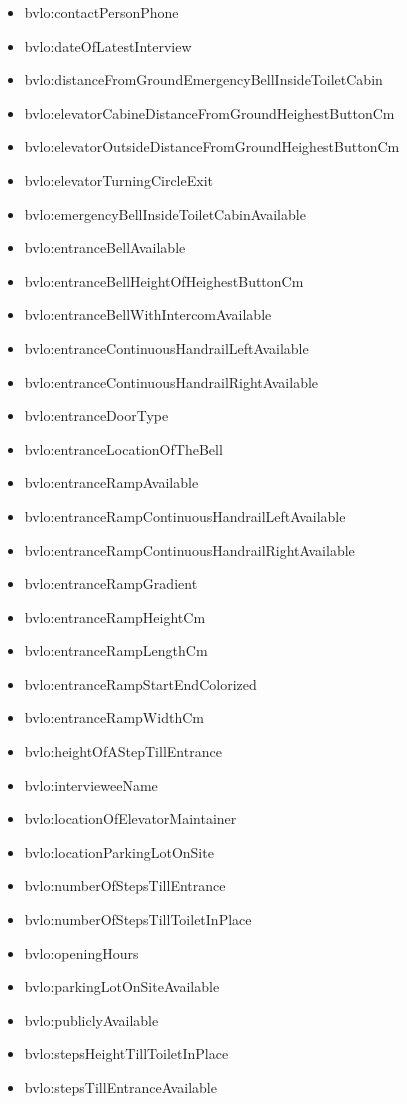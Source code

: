 \documentclass[a4paper,11pt]{article}
\begin{document}
\begin{itemize}
\item bvlo:contactPersonPhone
\item bvlo:dateOfLatestInterview
\item bvlo:distanceFromGroundEmergencyBellInsideToiletCabin
\item bvlo:elevatorCabineDistanceFromGroundHeighestButtonCm
\item bvlo:elevatorOutsideDistanceFromGroundHeighestButtonCm
\item bvlo:elevatorTurningCircleExit
\item bvlo:emergencyBellInsideToiletCabinAvailable
\item bvlo:entranceBellAvailable
\item bvlo:entranceBellHeightOfHeighestButtonCm
\item bvlo:entranceBellWithIntercomAvailable
\item bvlo:entranceContinuousHandrailLeftAvailable
\item bvlo:entranceContinuousHandrailRightAvailable
\item bvlo:entranceDoorType
\item bvlo:entranceLocationOfTheBell
\item bvlo:entranceRampAvailable
\item bvlo:entranceRampContinuousHandrailLeftAvailable
\item bvlo:entranceRampContinuousHandrailRightAvailable
\item bvlo:entranceRampGradient
\item bvlo:entranceRampHeightCm
\item bvlo:entranceRampLengthCm
\item bvlo:entranceRampStartEndColorized
\item bvlo:entranceRampWidthCm
\item bvlo:heightOfAStepTillEntrance
\item bvlo:intervieweeName
\item bvlo:locationOfElevatorMaintainer
\item bvlo:locationParkingLotOnSite
\item bvlo:numberOfStepsTillEntrance
\item bvlo:numberOfStepsTillToiletInPlace
\item bvlo:openingHours
\item bvlo:parkingLotOnSiteAvailable
\item bvlo:publiclyAvailable
\item bvlo:stepsHeightTillToiletInPlace
\item bvlo:stepsTillEntranceAvailable

\end{itemize}
\end{document}

